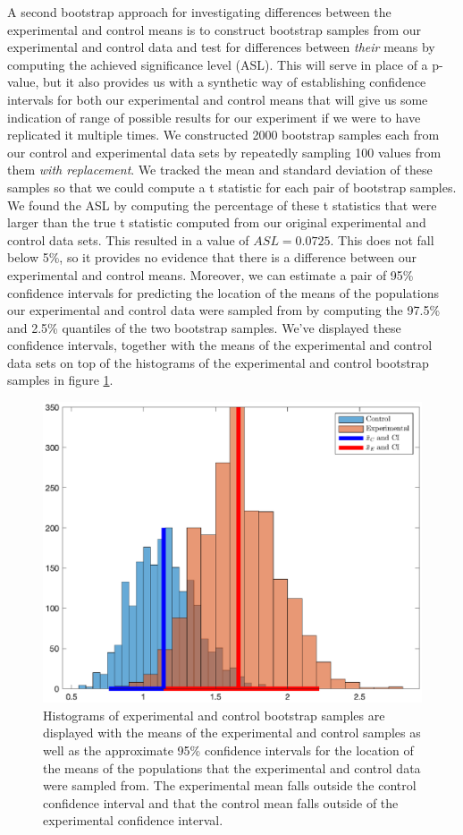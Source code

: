 \documentclass{amsart}
\begin{document}
A second bootstrap approach for investigating differences between the experimental and control means is to construct bootstrap samples from our experimental and control data and test for differences between \textsl{their} means by computing the achieved significance level (ASL). This will serve in place of a p-value, but it also provides us with a synthetic way of establishing confidence intervals for both our experimental and control means that will give us some indication of range of possible results for our experiment if we were to have replicated it multiple times. We constructed 2000 bootstrap samples each from our control and experimental data sets by repeatedly sampling 100 values from them \textsl{with replacement}. We tracked the mean and standard deviation of these samples so that we could compute a t statistic for each pair of bootstrap samples. We found the ASL by computing the percentage of these t statistics that were larger than the true t statistic computed from our original experimental and control data sets. This resulted in a value of $ASL=0.0725$. This does not fall below 5\%, so it provides no evidence that there is a difference between our experimental and control means. Moreover, we can estimate a pair of 95\% confidence intervals for predicting the location of the means of the populations our experimental and control data were sampled from by computing the 97.5\% and 2.5\% quantiles of the two bootstrap samples. We've displayed these confidence intervals, together with the means of the experimental and control data sets on top of the histograms of the experimental and control bootstrap samples in figure \ref{F:bootstrapTwoSample}.
\begin{figure}[H]
\centering
\includegraphics[scale=0.55]{bootstrapTwoSample}
\caption{
Histograms of experimental and control bootstrap samples are displayed with the means of the experimental and control samples as well as the approximate 95\% confidence intervals for the location of the means of the populations that the experimental and control data were sampled from. The experimental mean falls outside the control confidence interval and that the control mean falls outside of the experimental confidence interval.\label{F:bootstrapTwoSample}}
\end{figure}
\end{document}
